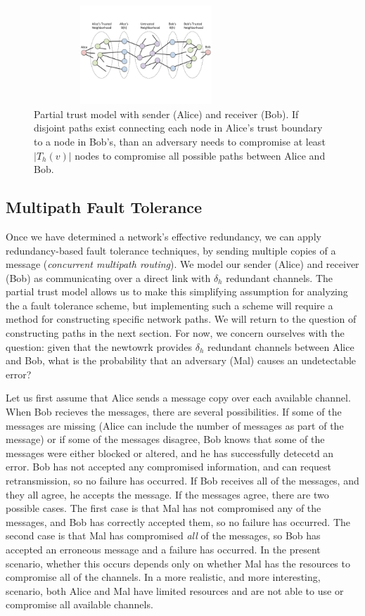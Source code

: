\documentclass{sig-alternate-05-2015}
\begin{document}
\begin{figure}
\centerline{\includegraphics[width=3.33in,height=1.46in]{fig-bob_Alice_trusted_neigh2}}
\caption{
Partial trust model with sender (Alice) and receiver (Bob).
If disjoint paths exist connecting each node in Alice's trust boundary to
a node in Bob's,
than an adversary needs to compromise at least $|T_h(v)|$ nodes to
compromise all possible paths between Alice and Bob.
}
\label{fig:trust-source-destionation}
\end{figure}

\subsection{Multipath Fault Tolerance}

Once we have determined a network's effective redundancy,
we can apply redundancy-based fault tolerance techniques,
by sending multiple copies of a message
({\em concurrent multipath routing}).
We model our sender (Alice) and receiver (Bob) as
communicating over a direct link with $\delta_h$ redundant channels.
The partial trust model allows us to make this simplifying assumption
for analyzing the a fault tolerance scheme,
but implementing such a scheme will require a method for constructing
specific network paths.
We will return to the question of constructing paths in the next section.
For now, we concern ourselves with the question:
given that the newtowrk provides $\delta_h$ redundant channels between
Alice and Bob,
what is the probability that an adversary (Mal) causes an undetectable
error?

Let us first assume that Alice sends a message copy over each available
channel.
When Bob recieves the messages, there are several possibilities.
If some of the messages are missing
(Alice can include the number of messages as part of the message)
or if some of the messages disagree,
Bob knows that some of the messages were either blocked or altered,
and he has successfully detecetd an error.
Bob has not accepted any compromised information,
and can request retransmission, so no failure has occurred.
If Bob receives all of the messages, and they all agree,
he accepts the message.
If the messages agree, there are two possible cases.
The first case is that Mal has not compromised any of the messages,
and Bob has correctly accepted them, so no failure has occurred.
The second case is that Mal has compromised {\em all} of the messages,
so Bob has accepted an erroneous message and a failure has occurred.
In the present scenario,
whether this occurs depends only on whether Mal has the resources to
compromise all of the channels.
In a more realistic, and more interesting, scenario,
both Alice and Mal have limited resources and are not able to use or
compromise all available channels.
\end{document}
